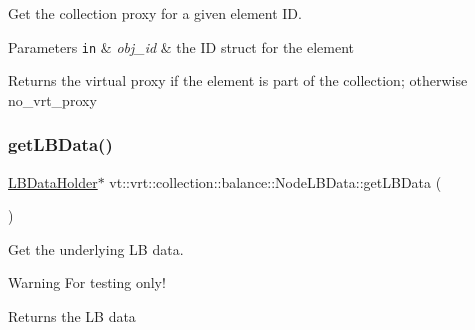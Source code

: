 Get the collection proxy for a given element ID. 


\begin{DoxyParams}[1]{Parameters}
\mbox{\tt in}  & {\em obj\+\_\+id} & the ID struct for the element\\
\hline
\end{DoxyParams}
\begin{DoxyReturn}{Returns}
the virtual proxy if the element is part of the collection; otherwise {\ttfamily no\+\_\+vrt\+\_\+proxy} 
\end{DoxyReturn}
\mbox{\label{structvt_1_1vrt_1_1collection_1_1balance_1_1_node_l_b_data_aa67707482afa83dfa96910ac42337ef0}} 
\subsubsection{\texorpdfstring{get\+L\+B\+Data()}{getLBData()}}
{\footnotesize\ttfamily \hyperlink{structvt_1_1vrt_1_1collection_1_1balance_1_1_l_b_data_holder}{L\+B\+Data\+Holder}$\ast$ vt\+::vrt\+::collection\+::balance\+::\+Node\+L\+B\+Data\+::get\+L\+B\+Data (\begin{DoxyParamCaption}{ }\end{DoxyParamCaption})\hspace{0.3cm}{\ttfamily [inline]}}



Get the underlying LB data. 

\begin{DoxyWarning}{Warning}
For testing only!
\end{DoxyWarning}
\begin{DoxyReturn}{Returns}
the LB data 
\end{DoxyReturn}
\mbox{\label{structvt_1_1vrt_1_1collection_1_1balance_1_1_node_l_b_data_a6802b9deda54d1b96280bff0431deab5}} 
